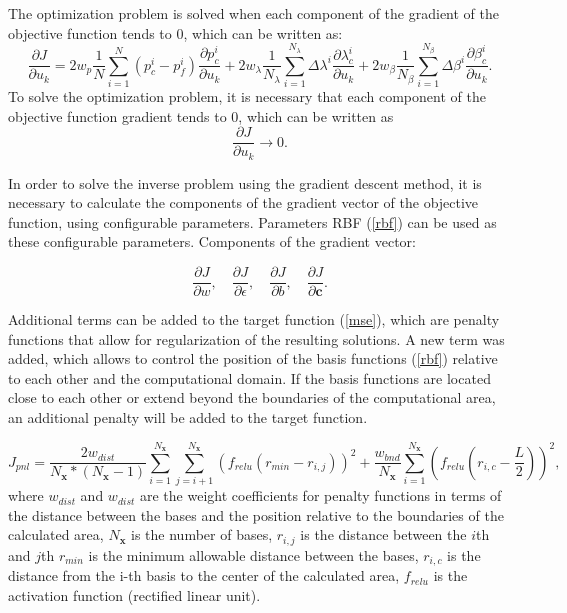 \documentclass[
11pt,%
tightenlines,%
twoside,%
onecolumn,%
nofloats,%
nobibnotes,%
nofootinbib,%
superscriptaddress,%
noshowpacs,%
centertags]%
{revtex4}
\begin{document}
The optimization problem is solved when each component of the gradient of the objective function tends to 0, which can be written as:
\begin{equation*}\label{grad}
	\frac{\partial J}{\partial u_k} = 
	2w_p\frac{1}{N}\sum_{i=1}^N	({p_c^i-p_f^i}) \frac{\partial p_c^i}{\partial u_k}+
	2w_{\lambda}\frac{1}{N_\lambda}\sum_{i=1}^{N_\lambda}{\Delta\lambda^i}\frac{\partial
		\lambda_{c}^i}{\partial u_k}+
	2w_{\beta}\frac{1}{N_\beta}\sum_{i=1}^{N_\beta}{\Delta\beta^i}\frac{\partial
		\beta_{c}^i}{\partial u_k}.
\end{equation*}
To solve the optimization problem, it is necessary that each
component  of the objective function gradient tends to 0, which can
be written as
\begin{equation} \label{rp}
	\frac{\partial J}{\partial u_k} \rightarrow 0.
\end{equation}

In order to solve the inverse problem using the gradient descent method, it is necessary to calculate the components of the gradient vector of the objective function, using configurable parameters. Parameters RBF (\ref{rbf}) can be used as these configurable parameters. Components of the gradient vector:

\begin{equation*}
	\frac{\partial J}{\partial w},\quad \frac{\partial J}{\partial \epsilon},\quad \frac{\partial J}{\partial b}, \quad \frac{\partial J}{\partial \mathbf{c}}.
\end{equation*}

Additional terms can be added to the target function (\ref{mse}), which are penalty functions that allow for regularization of the resulting solutions. A new term was added, which allows  to control the position of the basis functions (\ref{rbf}) relative to each other and the computational domain. If the basis functions are located close to each other or extend beyond the boundaries of the computational area, an additional penalty will be added to the target function.

\begin{equation} \label{pnl}
	J_{pnl}=\frac{2w_{dist}}{N_\textbf{x}*(N_\textbf{x}-1)}\sum_{i=1}^{N_\textbf{x}}{\sum_{j=i+1 }^{N_\textbf{x}}{\left(f_{relu}\left(r_{min} - r_{i,j}\right)\right)^2}} + 
	\frac{w_{bnd}}{N_\textbf{x}}\sum_{i=1}^{N_\textbf{x}}{\left(f_{relu}\left(r_{i,c} - \frac{L}{2}\right)\right)^2},
\end{equation}
where $w_{dist}$ and $w_{dist}$ are the weight coefficients for penalty functions in terms of the distance between the bases and the position relative to the boundaries of the calculated area, $N_\textbf{x}$ is the number of bases, $r_{i,j}$ is the distance between the $i$th and $j$th $r_{min}$ is the minimum allowable distance between the bases, $r_{i,c}$ is the distance from the i-th basis to the center of the calculated area, $f_{relu}$ is the activation function (rectified linear unit).
\end{document}
